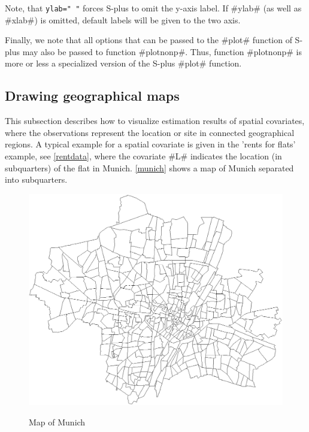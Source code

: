 Note, that \texttt{ylab=" "} forces S-plus to omit the y-axis label.
If #ylab# (as well as #xlab#) is omitted, default labels will be
given to the two axis.

Finally, we note that all options that can be passed to the #plot#
function of S-plus may also be passed to function #plotnonp#.
Thus, function #plotnonp# is more or less a specialized version of
the S-plus #plot# function.


\subsection{Drawing geographical maps}  

This subsection describes how to visualize estimation results of
spatial covariates, where the observations represent the location
or site in connected geographical regions. A typical example for a
spatial covariate is given in the 'rents for flats' example, see
\autoref{rentdata}, where the covariate #L# indicates the location
(in subquarters) of the flat in Munich. \autoref{munich} shows a
map of Munich separated into subquarters.

\begin{figure}
\centering
\includegraphics [scale=0.5]{grafiken/munich.eps}
{\em\caption{\label{munich} Map of Munich}}
\end{figure}


